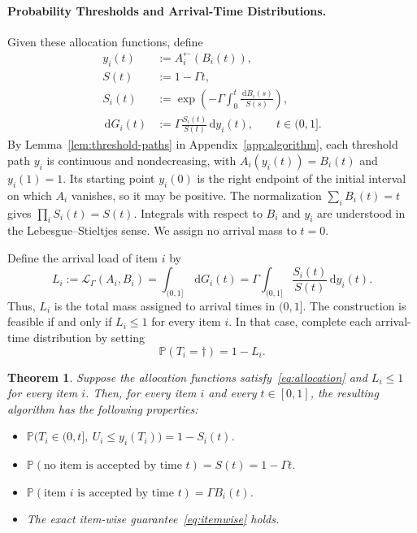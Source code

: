 \documentclass[11pt]{article}
\newtheorem{theorem}{Theorem}[section]
\theoremstyle{definition}
\theoremstyle{remark}
\newcommand{\Pp}{\mathbb P}
\newcommand{\dd}{\,\mathrm d}
\begin{document}
\paragraph{Probability Thresholds and Arrival-Time Distributions.} 
Given these allocation functions, define
\begin{equation}\label{eq:arrivals}
\begin{aligned}
 y_i(t)&:=A_i^{\leftarrow}(B_i(t)),\\
 S(t)&:=1-\Gamma t,\\
 S_i(t)&:=\exp\!\left(-\Gamma\int_0^t
                     \frac{\dd B_i(s)}{S(s)}\right),\\
 \dd G_i(t)&:=\Gamma\frac{S_i(t)}{S(t)}\dd y_i(t), \qquad t\in(0,1].
\end{aligned}
\end{equation}
By Lemma~\ref{lem:threshold-paths} in Appendix~\ref{app:algorithm}, each threshold path $y_i$ is continuous and nondecreasing, with $A_i(y_i(t))=B_i(t)$ and $y_i(1)=1$.
Its starting point $y_i(0)$ is the right endpoint of the initial interval on which $A_i$ vanishes, so it may be positive.
The normalization $\sum_iB_i(t)=t$ gives $\prod_iS_i(t)=S(t)$.
Integrals with respect to $B_i$ and $y_i$ are understood in the Lebesgue--Stieltjes sense.
We assign no arrival mass to $t=0$.

Define the arrival load of item $i$ by
\begin{equation}\label{eq:load}
 L_i:=\mathcal L_\Gamma(A_i,B_i) = \int_{(0,1]} \dd G_i(t)
     =\Gamma\int_{(0,1]}\frac{S_i(t)}{S(t)}\dd y_i(t).
\end{equation}
Thus, $L_i$ is the total mass assigned to arrival times in $(0,1]$.
The construction is feasible if and only if $L_i\le1$ for every item $i$.
In that case, complete each arrival-time distribution by setting
\[
 \Pp(T_i=\dagger)=1-L_i.
\]

\begin{theorem}\label{thm:bc}
Suppose the allocation functions satisfy~\eqref{eq:allocation} and $L_i\le1$ for every item $i$.
Then, for every item $i$ and every $t\in[0,1]$, the resulting algorithm has the following properties:
\begin{itemize}
\item $\Pp\bigl(T_i\in(0,t],\ U_i\le y_i(T_i)\bigr)=1-S_i(t)$.
\item $\Pp(\text{no item is accepted by time }t)=S(t)=1-\Gamma t$.
\item $\Pp(\text{item }i\text{ is accepted by time }t)=\Gamma B_i(t)$.
\item The exact item-wise guarantee~\eqref{eq:itemwise} holds.
\end{itemize}
\end{theorem}
\end{document}
